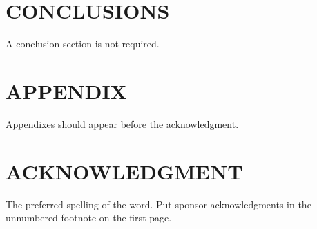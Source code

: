 \documentclass[letterpaper, 10 pt, conference]{ieeeconf}  %
\begin{document}
\section{CONCLUSIONS}
A conclusion section is not required. 
\section*{APPENDIX}
Appendixes should appear before the acknowledgment.
\section*{ACKNOWLEDGMENT}
The preferred spelling of the word. Put sponsor acknowledgments in the unnumbered footnote on the first page.\\









\end{document}
